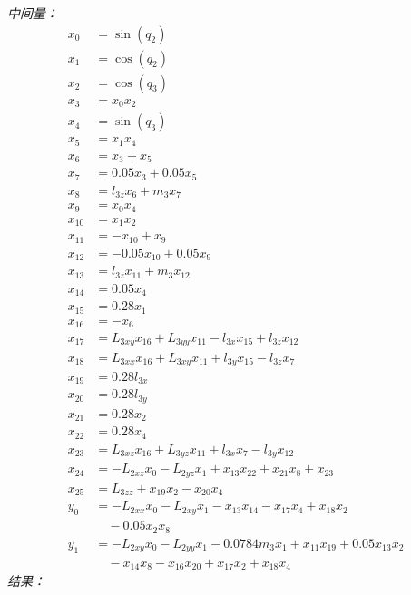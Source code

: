 \documentclass[11pt]{article}
\begin{document}
\textit{中间量：}
\begin{align*}
x_{0} &= \sin{\left(q_{2} \right)} \\
x_{1} &= \cos{\left(q_{2} \right)} \\
x_{2} &= \cos{\left(q_{3} \right)} \\
x_{3} &= x_{0} x_{2} \\
x_{4} &= \sin{\left(q_{3} \right)} \\
x_{5} &= x_{1} x_{4} \\
x_{6} &= x_{3} + x_{5} \\
x_{7} &= 0.05 x_{3} + 0.05 x_{5} \\
x_{8} &= l_{3z} x_{6} + m_{3} x_{7} \\
x_{9} &= x_{0} x_{4} \\
x_{10} &= x_{1} x_{2} \\
x_{11} &= - x_{10} + x_{9} \\
x_{12} &= - 0.05 x_{10} + 0.05 x_{9} \\
x_{13} &= l_{3z} x_{11} + m_{3} x_{12} \\
x_{14} &= 0.05 x_{4} \\
x_{15} &= 0.28 x_{1} \\
x_{16} &= - x_{6} \\
x_{17} &= L_{3xy} x_{16} + L_{3yy} x_{11} - l_{3x} x_{15} + l_{3z} x_{12} \\
x_{18} &= L_{3xx} x_{16} + L_{3xy} x_{11} + l_{3y} x_{15} - l_{3z} x_{7} \\
x_{19} &= 0.28 l_{3x} \\
x_{20} &= 0.28 l_{3y} \\
x_{21} &= 0.28 x_{2} \\
x_{22} &= 0.28 x_{4} \\
x_{23} &= L_{3xz} x_{16} + L_{3yz} x_{11} + l_{3x} x_{7} - l_{3y} x_{12} \\
x_{24} &= - L_{2xz} x_{0} - L_{2yz} x_{1} + x_{13} x_{22} + x_{21} x_{8} + x_{23} \\
x_{25} &= L_{3zz} + x_{19} x_{2} - x_{20} x_{4} \\
y_{0} &= - L_{2xx} x_{0} - L_{2xy} x_{1} - x_{13} x_{14} - x_{17} x_{4} + x_{18} x_{2} \\
&\quad - 0.05 x_{2} x_{8} \\
y_{1} &= - L_{2xy} x_{0} - L_{2yy} x_{1} - 0.0784 m_{3} x_{1} + x_{11} x_{19} + 0.05 x_{13} x_{2} \\
&\quad - x_{14} x_{8} - x_{16} x_{20} + x_{17} x_{2} + x_{18} x_{4}
\end{align*}
\textit{结果：}
\end{document}

